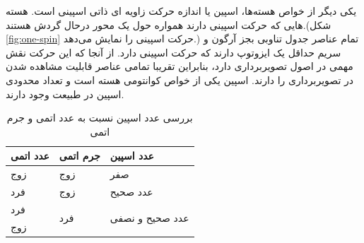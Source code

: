 \begin{figure}[t]
	\centering
		\hspace{0.2\linewidth}
	\caption{} 
\end{figure}

یکی دیگر از خواص هسته‌ها، اسپین
یا اندازه حرکت زاویه ای ذاتی اسپینی
است.
هسته هایی که حرکت اسپینی دارند همواره حول یک محور درحال گردش هستند.(شکل \ref{fig:one-spin} حرکت اسپینی را نمایش می‌دهد.)
تمام عناصر جدول تناوبی
بجز آرگون
و سریم
حداقل یک ایزوتوپ دارند که حرکت اسپینی دارد. از آنجا که این حرکت نقش مهمی در اصول تصویربرداری \mri دارد، بنابراین تقریبا تمامی عناصر قابلیت مشاهده شدن در تصویربرداری \mri را دارند. اسپین یکی از خواص کوانتومی هسته است و تعداد محدودی اسپین در طبیعت وجود دارند. 

\begin{table}[b]
	\centering
	\begin{tabular}{|C{5em}|C{5em}||C{14em}|}
		\hline {}
		
		عدد اتمی & جرم اتمی & عدد اسپین
		\\\hline\hline
		زوج & زوج & صفر \\\hline
		فرد & زوج & عدد صحیح \\\hline
		فرد & 
		\multirow{2}{*}{فرد}
		 & 
		\multirow{2}{*}{عدد صحیح و نصفی}
		\\\cline{0-0}
		زوج &  &
		\\\hline
	\end{tabular}
	\caption{بررسی عدد اسپین نسبت به عدد اتمی و جرم اتمی }
	\label{table:spin-even-odd}
\end{table}

